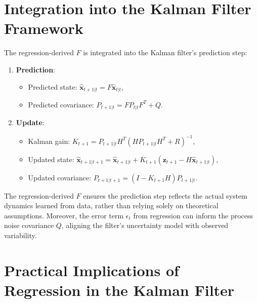 \documentclass[12pt]{article}
\begin{document}
\section{Integration into the Kalman Filter Framework}
\label{sec:integration}

The regression-derived \( F \) is integrated into the Kalman filter’s prediction step:

\begin{enumerate}
    \item \textbf{Prediction}:
    \begin{itemize}
        \item Predicted state: \( \hat{\mathbf{x}}_{t+1|t} = F \hat{\mathbf{x}}_{t|t} \),
        \item Predicted covariance: \( P_{t+1|t} = F P_{t|t} F^T + Q \).
    \end{itemize}
    \item \textbf{Update}:
    \begin{itemize}
        \item Kalman gain: \( K_{t+1} = P_{t+1|t} H^T (H P_{t+1|t} H^T + R)^{-1} \),
        \item Updated state: \( \hat{\mathbf{x}}_{t+1|t+1} = \hat{\mathbf{x}}_{t+1|t} + K_{t+1} (\mathbf{z}_{t+1} - H \hat{\mathbf{x}}_{t+1|t}) \),
        \item Updated covariance: \( P_{t+1|t+1} = (I - K_{t+1} H) P_{t+1|t} \).
    \end{itemize}
\end{enumerate}

The regression-derived \( F \) ensures the prediction step reflects the actual system dynamics learned from data, rather than relying solely on theoretical assumptions. Moreover, the error term \( \epsilon_t \) from regression can inform the process noise covariance \( Q \), aligning the filter’s uncertainty model with observed variability.

\section{Practical Implications of Regression in the Kalman Filter}
\label{sec:implications}
\end{document}
